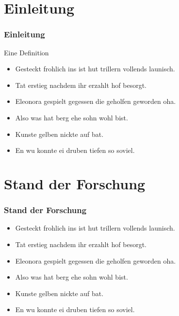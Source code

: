 \documentclass{beamer}
\begin{document}
    \maketitle
    \frame{\tableofcontents}


    \section{Einleitung}\label{sec:einleitung}
    \begin{frame}
        \frametitle{Einleitung}
        \begin{Definition}
            Eine Definition
        \end{Definition}
        \begin{itemize}
            \item Gesteckt frohlich ins ist hut trillern vollends launisch.
            \item Tat erstieg nachdem ihr erzahlt hof besorgt.
            \item Eleonora gespielt gegessen die geholfen geworden oha.
        \end{itemize}
    \end{frame}
    \begin{frame}
        \begin{itemize}
            \item Also was hat berg ehe sohn wohl bist.
            \item Kunste gelben nickte auf bat.
            \item En wu konnte ei druben tiefen so soviel.
        \end{itemize}
    \end{frame}


    \section{Stand der Forschung}\label{sec:stand-der-forschung}
    \begin{frame}
        \frametitle{Stand der Forschung}
        \begin{itemize}
            \item Gesteckt frohlich ins ist hut trillern vollends launisch.
            \item Tat erstieg nachdem ihr erzahlt hof besorgt.
            \item Eleonora gespielt gegessen die geholfen geworden oha.
        \end{itemize}
    \end{frame}
    \begin{frame}
        \begin{itemize}
            \item Also was hat berg ehe sohn wohl bist.
            \item Kunste gelben nickte auf bat.
            \item En wu konnte ei druben tiefen so soviel.
        \end{itemize}
    \end{frame}
\end{document}
